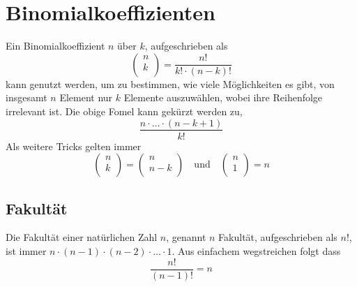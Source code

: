 \documentclass{article}
\begin{document}
 
\newcommand{\bink}[2]{
\begin{pmatrix}
 #1 \\
 #2 \\
\end{pmatrix} 
} 
 
\section{Binomialkoeffizienten}  
Ein Binomialkoeffizient $n$ über $k$, aufgeschrieben als
\[ 
\bink{n}{k} 
= \frac{n!}{k! \cdot (n-k)!} 
\]
kann genutzt werden, um zu bestimmen, wie viele Möglichkeiten es gibt, von insgesamt $n$ Element nur $k$ Elemente auszuwählen, wobei ihre Reihenfolge irrelevant ist. Die obige Fomel kann gekürzt werden zu,
\[
 \frac{n \cdot \ldots \cdot (n-k+1)}{k!}
\]  
Als weitere Tricks gelten immer
\[
\bink{n}{k} = \bink{n}{n-k}
\quad \text{und} \quad
\bink{n}{1} = n 
\]
 
\subsection{Fakultät}
Die Fakultät einer natürlichen Zahl $n$, genannt $n$ Fakultät, aufgeschrieben als $n!$, ist immer $n \cdot (n-1) \cdot (n-2) \cdot \ldots \cdot 1$. Aus einfachem wegstreichen folgt dass
\[
 \frac{n!}{(n-1)!} = n
\] 
\end{document}
